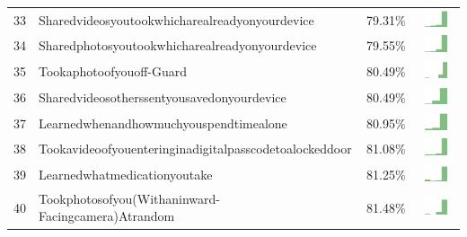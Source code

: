 \documentclass[a4paper,12pt]{article}
\begin{document}
\begin{longtable}{| p{0.5cm} | p{7cm} | p{1cm} | c |}
33 & Sharedvideosyoutookwhicharealreadyonyourdevice & 79.31\% & \includegraphics[width = 2cm, height = 0.5cm]{sharedvideosyoutookwhicharealreadyonyourdeviceWORKCONTACTS} \\  
34 & Sharedphotosyoutookwhicharealreadyonyourdevice & 79.55\% & \includegraphics[width = 2cm, height = 0.5cm]{sharedphotosyoutookwhicharealreadyonyourdeviceWORKCONTACTS} \\  
35 & Tookaphotoofyouoff-Guard & 80.49\% & \includegraphics[width = 2cm, height = 0.5cm]{tookaphotoofyouoff-guardWORKCONTACTS} \\  
36 & Sharedvideosotherssentyousavedonyourdevice & 80.49\% & \includegraphics[width = 2cm, height = 0.5cm]{sharedvideosotherssentyousavedonyourdeviceWORKCONTACTS} \\  
37 & Learnedwhenandhowmuchyouspendtimealone & 80.95\% & \includegraphics[width = 2cm, height = 0.5cm]{learnedwhenandhowmuchyouspendtimealoneWORKCONTACTS} \\  
38 & Tookavideoofyouenteringinadigitalpasscodetoalockeddoor & 81.08\% & \includegraphics[width = 2cm, height = 0.5cm]{tookavideoofyouenteringinadigitalpasscodetoalockeddoorWORKCONTACTS} \\  
39 & Learnedwhatmedicationyoutake & 81.25\% & \includegraphics[width = 2cm, height = 0.5cm]{learnedwhatmedicationyoutakeWORKCONTACTS} \\  
40 & Tookphotosofyou(Withaninward-Facingcamera)Atrandom & 81.48\% & \includegraphics[width = 2cm, height = 0.5cm]{tookphotosofyou(withaninward-facingcamera)atrandomWORKCONTACTS} \\  

\end{longtable}
\end{document}
